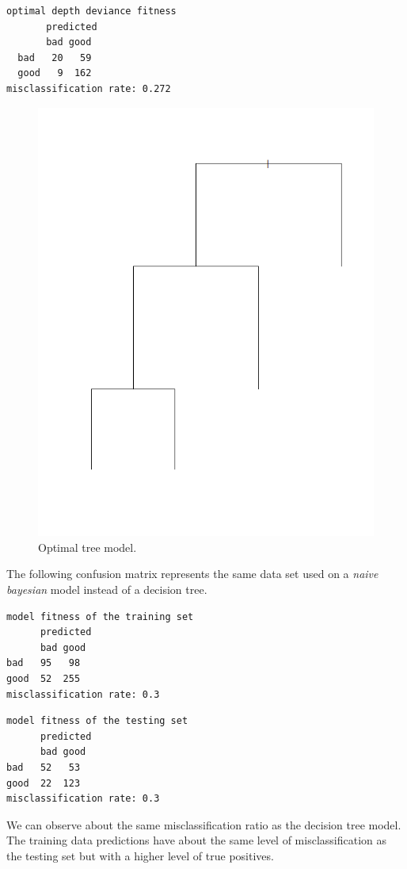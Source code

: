 \documentclass[a4paper,12pt]{article}
\begin{document}
\begin{verbatim}
optimal depth deviance fitness
       predicted
       bad good
  bad   20   59
  good   9  162
misclassification rate: 0.272
\end{verbatim}

\begin{figure}[H]
\centering
\begin{minipage}[]{0.5\textwidth}
  \includegraphics[width=\textwidth]{figures/best_subtree.png}  
  \caption{Optimal tree model. \label{fig:best_subtree}}
 \end{minipage}
\end{figure}

The following confusion matrix represents the same data set used on a \textit{naive bayesian} model instead of a decision tree.

\begin{verbatim}
model fitness of the training set
      predicted
      bad good
bad   95   98
good  52  255
misclassification rate: 0.3
\end{verbatim}
\begin{verbatim}
model fitness of the testing set 
      predicted
      bad good
bad   52   53
good  22  123
misclassification rate: 0.3
\end{verbatim}
We can observe about the same misclassification ratio as the decision tree model. The training data predictions have about the same level of misclassification as the testing set but with a higher level of true positives.
\end{document}
